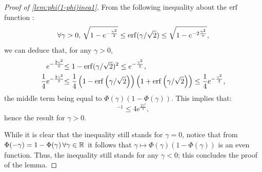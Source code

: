      \begin{proof}[Proof of \cref{lem:phi(1-phi)ineq1}]
        From the following inequality about the $\operatorname{erf}$ function \citep{chu_bounds_1955}:
\begin{equation}
        \forall \gamma>0,\, \sqrt{1-e^{-\frac{\gamma^2}{2}}}\leq\operatorname{erf}(\gamma/\sqrt{2})\leq\sqrt{1-e^{-2\frac{\gamma^2}{\pi}}},
    \end{equation}
we can deduce that, for any $\gamma>0$,
\begin{equation}
\begin{aligned}
    e^{-\frac{2\gamma^2}{\pi}}\hspace*{-3pt}&\leq 1-\operatorname{erf}(\gamma/\sqrt{2})^2\leq e^{-\frac{\gamma^2}{2}} ,  \\
    \frac{1}{4}e^{-\frac{2\gamma^2}{\pi}}\hspace*{-3pt}&\leq\frac{1}{4}\left(1-\operatorname{erf}\left({\gamma}/{\sqrt{2}}\right)\right)\left(1+\operatorname{erf}\left({\gamma}/{\sqrt{2}}\right)\right)\leq\frac{1}{4} e^{-\frac{\gamma^2}{2}}  , 
\end{aligned}
\end{equation}
the middle term being equal to $\Phi(\gamma)(1-\Phi(\gamma))$. This implies that:
\begin{equation}
    [\Phi(\gamma)(1-\Phi(\gamma))]^{-1}\leq 4 e^{\frac{2\gamma^2}{\pi}} ,
\end{equation}
hence the result for $\gamma>0$.

While it is clear that the inequality still stands for $\gamma=0$, notice that from $\Phi(-\gamma)=1-\Phi(\gamma)\,\forall\gamma\in\mathbb{R}$ it follows that $\gamma\mapsto\Phi(\gamma)(1-\Phi(\gamma))$ is an even function. Thus, the inequality still stands for any $\gamma<0$; this concludes the proof of the lemma.
     \end{proof}



